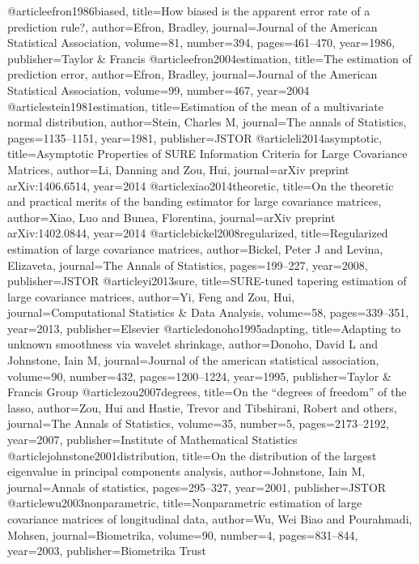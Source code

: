 @article{efron1986biased,
  title={How biased is the apparent error rate of a prediction rule?},
  author={Efron, Bradley},
  journal={Journal of the American Statistical Association},
  volume={81},
  number={394},
  pages={461--470},
  year={1986},
  publisher={Taylor \& Francis}
}
@article{efron2004estimation,
  title={The estimation of prediction error},
  author={Efron, Bradley},
  journal={Journal of the American Statistical Association},
  volume={99},
  number={467},
  year={2004}
}
@article{stein1981estimation,
  title={Estimation of the mean of a multivariate normal distribution},
  author={Stein, Charles M},
  journal={The annals of Statistics},
  pages={1135--1151},
  year={1981},
  publisher={JSTOR}
}
@article{li2014asymptotic,
  title={Asymptotic Properties of SURE Information Criteria for Large Covariance Matrices},
  author={Li, Danning and Zou, Hui},
  journal={arXiv preprint arXiv:1406.6514},
  year={2014}
}
@article{xiao2014theoretic,
  title={On the theoretic and practical merits of the banding estimator for large covariance matrices},
  author={Xiao, Luo and Bunea, Florentina},
  journal={arXiv preprint arXiv:1402.0844},
  year={2014}
}
@article{bickel2008regularized,
  title={Regularized estimation of large covariance matrices},
  author={Bickel, Peter J and Levina, Elizaveta},
  journal={The Annals of Statistics},
  pages={199--227},
  year={2008},
  publisher={JSTOR}
}
@article{yi2013sure,
  title={SURE-tuned tapering estimation of large covariance matrices},
  author={Yi, Feng and Zou, Hui},
  journal={Computational Statistics \& Data Analysis},
  volume={58},
  pages={339--351},
  year={2013},
  publisher={Elsevier}
}
@article{donoho1995adapting,
  title={Adapting to unknown smoothness via wavelet shrinkage},
  author={Donoho, David L and Johnstone, Iain M},
  journal={Journal of the american statistical association},
  volume={90},
  number={432},
  pages={1200--1224},
  year={1995},
  publisher={Taylor \& Francis Group}
}
@article{zou2007degrees,
  title={On the “degrees of freedom” of the lasso},
  author={Zou, Hui and Hastie, Trevor and Tibshirani, Robert and others},
  journal={The Annals of Statistics},
  volume={35},
  number={5},
  pages={2173--2192},
  year={2007},
  publisher={Institute of Mathematical Statistics}
}
@article{johnstone2001distribution,
  title={On the distribution of the largest eigenvalue in principal components analysis},
  author={Johnstone, Iain M},
  journal={Annals of statistics},
  pages={295--327},
  year={2001},
  publisher={JSTOR}
}
@article{wu2003nonparametric,
  title={Nonparametric estimation of large covariance matrices of longitudinal data},
  author={Wu, Wei Biao and Pourahmadi, Mohsen},
  journal={Biometrika},
  volume={90},
  number={4},
  pages={831--844},
  year={2003},
  publisher={Biometrika Trust}
}
